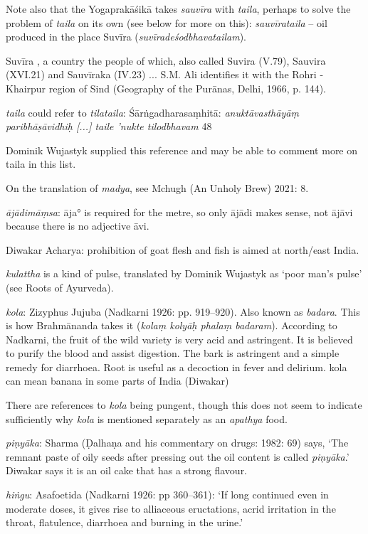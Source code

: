 \begin{ekdosis}
\begin{philcomm}[hp01_059]
Note also that the Yogaprakāśikā takes \emph{sauvīra} with \emph{taila}, perhaps to solve the problem of \emph{taila} on its own (see below for more on this): \emph{sauvīrataila} -- oil produced in the place Suvīra (\emph{suvīradeśodbhavatailam}).

Suvīra , a country the people of which, also called Suvira (V.79), Sauvira (XVI.21) and Sauvīraka (IV.23) ... S.M. Ali identifies it with the Rohri - Khairpur region of Sind (Geography of the Purānas, Delhi, 1966, p. 144).

\emph{taila} could refer to \emph{tilataila}:
Śārṅgadharasaṃhitā:
\emph{anuktāvasthāyāṃ paribhāṣāvidhiḥ [...] taile ’nukte tilodbhavam} 48

Dominik Wujastyk supplied this reference and may be able to comment more on taila in this list.

On the translation of \emph{madya}, see Mchugh (An Unholy Brew) 2021: 8.

\emph{ājādimāṃsa}: āja° is required for the metre, so only ājādi makes sense, not ājāvi because there is no adjective āvi.

Diwakar Acharya: prohibition of goat flesh and fish is aimed at north/east India.

\emph{kulattha} is a kind of pulse, translated by Dominik Wujastyk as `poor man's pulse' (see Roots of Ayurveda).

\emph{kola}: Zizyphus Jujuba (Nadkarni 1926: pp. 919--920). Also known as \emph{badara}. This is how Brahmānanda takes it (\emph{kolaṃ kolyāḥ phalaṃ badaram}). According to Nadkarni, the fruit of the wild variety is very acid and astringent. It is believed to purify the blood and assist digestion. The bark is astringent and a simple remedy for diarrhoea. Root is useful as a decoction in fever and delirium.
kola can mean banana in some parts of India (Diwakar)

There are references to \emph{kola} being pungent, though this does not seem to indicate sufficiently why \emph{kola} is mentioned separately as an \emph{apathya} food.

\emph{piṇyāka}: Sharma (Ḍalhaṇa and his commentary on drugs: 1982: 69) says, ‘The remnant paste of oily seeds after pressing out the oil content is called \emph{piṇyāka}.’ Diwakar says it is an oil cake that has a strong flavour.

\emph{hiṅgu}: Asafoetida (Nadkarni 1926: pp 360–361): `If long continued even in moderate doses, it gives rise to alliaceous eructations, acrid irritation in the throat, flatulence, diarrhoea and burning in the urine.'


\end{philcomm}
\end{ekdosis}
